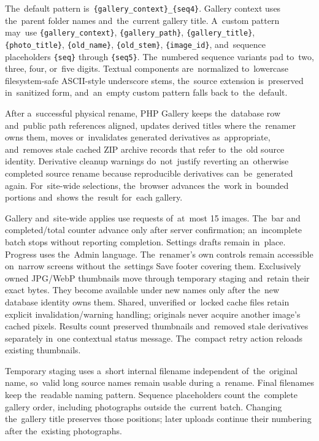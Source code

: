 \documentclass[11pt,a4paper]{article}
\newcommand{\codeword}[1]{\nolinkurl{#1}}
\begin{document}
The~default pattern is~\codeword{\{gallery_context\}_\{seq4\}}. Gallery context
uses the~parent folder names and~the~current gallery title. A~custom pattern
may~use \codeword{\{gallery_context\}}, \codeword{\{gallery_path\}},
\codeword{\{gallery_title\}},
\codeword{\{photo_title\}}, \codeword{\{old_name\}}, \codeword{\{old_stem\}},
\codeword{\{image_id\}}, and~sequence placeholders \codeword{\{seq\}} through
\codeword{\{seq5\}}. The~numbered sequence variants pad to~two, three, four,
or~five digits. Textual components are~normalized to~lowercase filesystem-safe
ASCII-style underscore stems, the~source extension is~preserved in~sanitized
form, and~an~empty custom pattern falls back to~the~default.

After a~successful physical rename, PHP Gallery keeps the~database row
and~public path references aligned, updates derived titles where the~renamer
owns them, moves or~invalidates generated derivatives as~appropriate,
and~removes stale cached ZIP archive records that refer to~the~old source
identity. Derivative cleanup warnings do~not~justify reverting an~otherwise
completed source rename because reproducible derivatives can~be~generated again.
For~site-wide selections, the~browser advances the~work in~bounded portions
and~shows the~result for~each gallery.

Gallery and~site-wide applies use requests of~at~most 15 images. The~bar and
completed/total counter advance only after server confirmation; an~incomplete
batch stops without reporting completion. Settings drafts remain in~place.
Progress uses the~Admin language. The~renamer's own controls remain accessible
on~narrow screens without the~settings Save footer covering them.
Exclusively owned JPG/WebP thumbnails move through temporary staging and~retain
their exact bytes. They become available under new names only after the~new
database identity owns them. Shared, unverified or~locked cache files retain
explicit invalidation/warning handling; originals never acquire another
image's cached pixels. Results count preserved thumbnails and~removed stale
derivatives separately in~one contextual status message. The~compact retry
action reloads existing thumbnails.

Temporary staging uses a~short internal filename independent of~the~original
name, so~valid long source names remain usable during a~rename. Final filenames
keep the~readable naming pattern. Sequence placeholders count the~complete
gallery order, including photographs outside the~current batch. Changing
the~gallery title preserves those positions; later uploads continue their
numbering after the~existing photographs.
\end{document}
